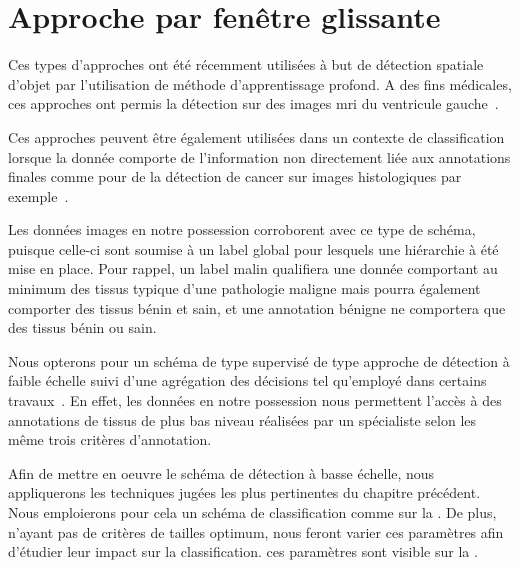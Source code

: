 \section{Approche par fenêtre glissante}
Ces types d'approches ont été récemment utilisées à but de détection spatiale d'objet par l'utilisation de méthode d'apprentissage profond. A des fins médicales, ces approches ont permis la détection sur des images \gls{mri} du ventricule gauche~\cite{Helwan2017}.\par

Ces approches peuvent être également utilisées dans un contexte de classification lorsque la donnée comporte de l'information non directement liée aux annotations finales comme pour de la détection de cancer sur images histologiques par exemple~\cite{Hou2016,Alqudah2019}.\par

Les données images en notre possession corroborent avec ce type de schéma, puisque celle-ci sont soumise à un label global pour lesquels une hiérarchie à été mise en place. Pour rappel, un label malin qualifiera une donnée comportant au minimum des tissus typique d'une pathologie maligne mais pourra également comporter des tissus bénin et sain, et une annotation bénigne ne comportera que des tissus bénin ou sain.\par

Nous opterons pour un schéma de type supervisé de type approche de détection à faible échelle suivi d'une agrégation des décisions tel qu'employé dans certains travaux~\cite{Alqudah2019}. En effet, les données en notre possession nous permettent l'accès à des annotations de tissus de plus bas niveau réalisées par un spécialiste selon les même trois critères d'annotation.\par

Afin de mettre en oeuvre le schéma de détection à basse échelle, nous appliquerons les techniques jugées les plus pertinentes du chapitre précédent. Nous emploierons pour cela un schéma de classification comme sur la . De plus, n'ayant pas de critères de tailles optimum, nous feront varier ces paramètres afin d'étudier leur impact sur la classification. ces paramètres sont visible sur la .\par

